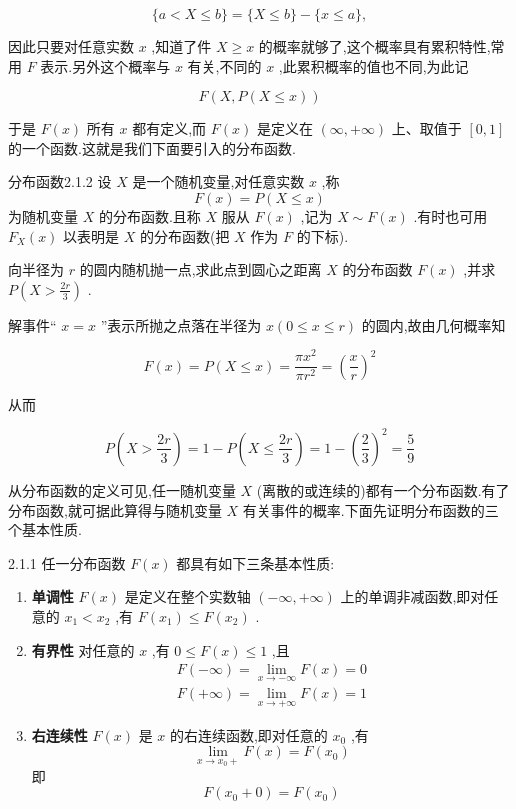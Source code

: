 \[
\{a < X \leq b \} = \{ X \leq b\} - \{x\leq a\},
\]

因此只要对任意实数 $ x $ ,知道了件 $ X\geq x $ 的概率就够了,这个概率具有累积特性,常用 $ F $ 表示.另外这个概率与 $ x $ 有关,不同的 $ x $ ,此累积概率的值也不同,为此记

\[
F(X,P(X\leq x))
\]

于是 $ F(x) $ 所有 $ x $ 都有定义,而 $ F(x) $ 是定义在 $ (\infty,+\infty ) $ 上、取值于 $ [0,1] $ 的一个函数.这就是我们下面要引入的分布函数.

\begin{definition}{分布函数}{2.1.2}
	设 $ X $ 是一个随机变量,对任意实数 $ x $ ,称
	\begin{equation} 
	F(x)=P(X \leqslant x) \label{2.1.1}
	\end{equation}
	为随机变量 $ X $ 的分布函数.且称 $ X $ 服从 $ F(x) $ ,记为 $ X\sim F(x) $ .有时也可用 $ F_{X}(x) $ 以表明是 $ X $ 的分布函数(把 $ X $ 作为 $ F $ 的下标).
\end{definition}

\begin{example}\label{exam:2.1.1}
	向半径为 $ r $ 的圆内随机抛一点,求此点到圆心之距离 $ X $ 的分布函数 $ F(x) $ ,并求 $ P\left(X>\frac{2 r}{3}\right) $ .
	
	解事件“ $ x=x $ ”表示所抛之点落在半径为 $ x(0 \leqslant x \leqslant r) $ 的圆内,故由几何概率知
	
	\[ 
	F(x)=P(X \leqslant x)=\frac{\pi x^{2}}{\pi r^{2}}=\left(\frac{x}{r}\right)^{2}
	\]
	
	从而
	
	\[ 
	P\left(X>\frac{2 r}{3}\right)=1-P\left(X \leqslant \frac{2 r}{3}\right)=1-\left(\frac{2}{3}\right)^{2}=\frac{5}{9}
	\]
	
	
\end{example}


从分布函数的定义可见,任一随机变量 $ X $ (离散的或连续的)都有一个分布函数.有了分布函数,就可据此算得与随机变量 $ X $ 有关事件的概率.下面先证明分布函数的三个基本性质.

\begin{theorem}{}{2.1.1}
	任一分布函数 $ F(x) $ 都具有如下三条基本性质:
	\begin{enumerate}
		\item \textbf{单调性} $ F(x) $ 是定义在整个实数轴 $ (-\infty,+\infty ) $ 上的单调非减函数,即对任意的 $ x_1<x_2 $ ,有 $ F(x_1)\leq F(x_2) $ .
		\item \textbf{有界性} 对任意的 $ x $ ,有 $ 0\leq F(x)\leq 1 $ ,且
		\[ 
		\begin{array}{l}{F(-\infty)=\lim _{x \rightarrow-\infty} F(x)=0} \\ {F(+\infty)=\lim _{x \rightarrow+\infty} F(x)=1}\end{array}
		\]
		
		\item \textbf{右连续性} $ F(x) $ 是 $ x $ 的右连续函数,即对任意的 $ x_0 $ ,有
		\[ 
		\lim _{x \rightarrow x_{0}+} F(x)=F\left(x_{0}\right)
		\]
		即
		\[ 
		F\left(x_{0}+0\right)=F\left(x_{0}\right)
		\]
	\end{enumerate}
\end{theorem}

